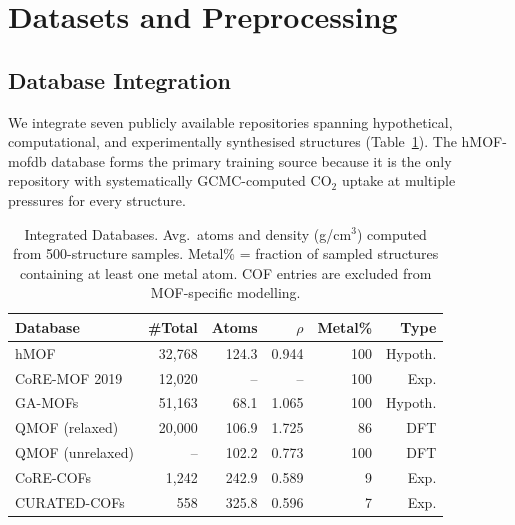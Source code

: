 \documentclass[conference]{IEEEtran}
\begin{document}
\section{Datasets and Preprocessing}
\label{sec:data}

\subsection{Database Integration}

We integrate seven publicly available repositories spanning hypothetical,
computational, and experimentally synthesised structures (Table~\ref{tab:db}).
The hMOF-mofdb database \cite{wilmer2012} forms the primary training source
because it is the only repository with systematically GCMC-computed CO$_2$
uptake at multiple pressures for every structure.

\begin{table}[!t]
\renewcommand{\arraystretch}{1.25}
\centering
\caption{Integrated Databases.
         Avg.\ atoms and density (g/cm$^3$) computed from 500-structure samples.
         Metal\% = fraction of sampled structures containing at least one
         metal atom.  COF entries are excluded from MOF-specific modelling.}
\label{tab:db}
\begin{tabular}{@{}lrrrrr@{}}
\toprule
\textbf{Database} & \textbf{\#Total} & \textbf{Atoms} & \textbf{$\rho$} & \textbf{Metal\%} & \textbf{Type} \\
\midrule
hMOF             & 32{,}768 & 124.3 & 0.944 & 100 & Hypoth.\\
CoRE-MOF 2019    & 12{,}020 & --    & --    & 100 & Exp.   \\
GA-MOFs          & 51{,}163 &  68.1 & 1.065 & 100 & Hypoth.\\
QMOF (relaxed)   & 20{,}000 & 106.9 & 1.725 &  86 & DFT    \\
QMOF (unrelaxed) &  --      & 102.2 & 0.773 & 100 & DFT    \\
CoRE-COFs        &  1{,}242 & 242.9 & 0.589 &   9 & Exp.   \\
CURATED-COFs     &    558   & 325.8 & 0.596 &   7 & Exp.   \\
\bottomrule
\end{tabular}
\end{table}
\end{document}
